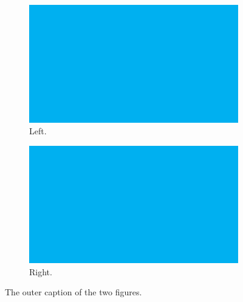 \begin{figure}[h!]
  \centering
  \begin{subfigure}[b]{0.39\columnwidth}
    \centering
    \includegraphics[width=.3\textwidth]{fig/fig1.pdf}
    \caption{Left.}
    \label{fig:subcaption-two-inner-left}
  \end{subfigure}
  \begin{subfigure}[b]{0.59\columnwidth}
    \centering
    \includegraphics[width=.5\textwidth]{fig/fig1.pdf}
    \caption{Right.}
    \label{fig:subcaption-two-inner-right}
  \end{subfigure}
  \caption{The outer caption of the two figures.}
  \label{fig:subcaption}
\end{figure}
